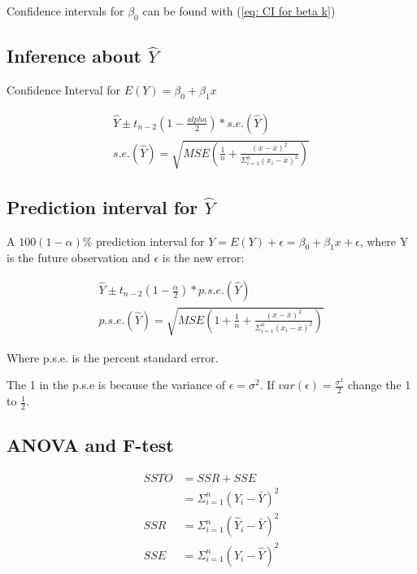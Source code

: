 \documentclass[10pt]{article}
\newcommand{\hlEmph}[1]{\colorbox{DarkSeaGreen2}{#1}}
\begin{document}
\begin{multicols}{3}
    \hlEmph{Confidence intervals} for $\beta_0$ can be found with (\ref{eq: CI for beta k})

    \subsection[Inference about sample Y]{Inference about $\hat Y$}

    \hlEmph{Confidence Interval for $E(Y) = \beta_0 + \beta_1 x$}

    \begin{align}\label{eq: ci for sample Y}
        \hat Y \pm t_{n-2} (1 - \frac{alpha}{2}) * s.e.(\hat Y) \\
        s.e.(\hat Y) = \sqrt{MSE ( \frac{1}{n} + \frac{(x-\bar x)^2}{\Sigma_{i=1}^n (x_i - \bar x)^2} )}
    \end{align}

    \subsection[Prediction interval for sample Y]{Prediction interval for $\hat Y$}

    A $100(1-\alpha)\%$ prediction interval for $Y=E(Y) + \epsilon = \beta_0 + \beta_1 x + \epsilon$, where Y is the future observation and $\epsilon$ is the new error:

    \begin{align} \label{eq: pi for Y}
        \hat Y \pm t_{n-2} ( 1 - \frac{\alpha}{2} ) * p.s.e.(\hat Y) \\
        p.s.e.(\hat Y) = \sqrt{MSE( 1 + \frac{1}{n} + \frac{ (x - \bar x)^2 }{\Sigma_{i=1}^n (x_i - \bar x)^2 } )}
    \end{align}

    Where p.s.e. is the percent standard error.

    The 1 in the p.s.e is because the variance of $\epsilon = \sigma^2$. If $var(\epsilon) = \frac{\sigma^2}{2}$ change the 1 to $\frac{1}{2}$.

    \subsection{ANOVA and F-test}

    \begin{align}\label{eq: SSTO}
        SSTO & = SSR + SSE                            \\
             & = \Sigma_{i=1}^n (Y_i - \bar Y)^2      \\
        SSR  & = \Sigma_{i=1}^n (\hat Y_i - \bar Y)^2 \\
        SSE  & = \Sigma_{i=1}^n (Y_i - \hat Y)^2      \\
    \end{align}


\end{multicols}
\end{document}

